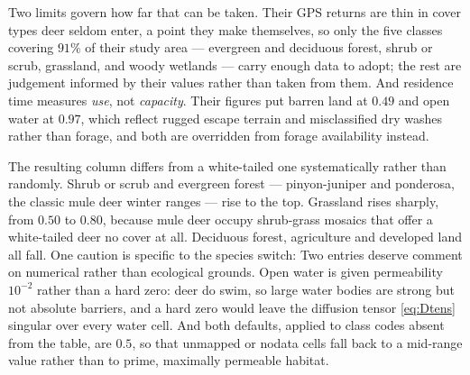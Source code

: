 \documentclass[11pt]{article}
\begin{document}
Two limits govern how far that can be taken. Their GPS returns are thin in cover types deer seldom enter, a point they make themselves, so only the five classes covering $91\%$ of their study area --- evergreen and deciduous forest, shrub or scrub, grassland, and woody wetlands --- carry enough data to adopt; the rest are judgement informed by their values rather than taken from them. And residence time measures \emph{use}, not \emph{capacity}. Their figures put barren land at $0.49$ and open water at $0.97$, which reflect rugged escape terrain and misclassified dry washes rather than forage, and both are overridden from forage availability instead.

The resulting column differs from a white-tailed one systematically rather than randomly. Shrub or scrub and evergreen forest --- pinyon-juniper and ponderosa, the classic mule deer winter ranges --- rise to the top. Grassland rises sharply, from $0.50$ to $0.80$, because mule deer occupy shrub-grass mosaics that offer a white-tailed deer no cover at all. Deciduous forest, agriculture and developed land all fall. One caution is specific to the species switch: Two entries deserve comment on numerical rather than ecological grounds. Open water is given permeability $10^{-2}$ rather than a hard zero: deer do swim, so large water bodies are strong but not absolute barriers, and a hard zero would leave the diffusion tensor \eqref{eq:Dtens} singular over every water cell. And both defaults, applied to class codes absent from the table, are $0.5$, so that unmapped or nodata cells fall back to a mid-range value rather than to prime, maximally permeable habitat.
\end{document}
